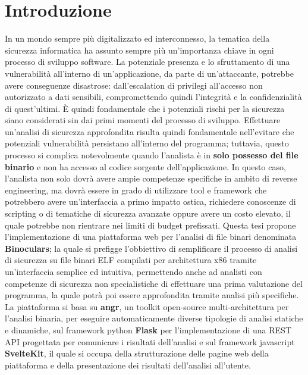 \documentclass[../main.tex]{subfiles}
\begin{document}
\chapter{Introduzione}
\label{chap:intro}
In un mondo sempre più digitalizzato ed interconnesso, la tematica della sicurezza informatica ha assunto sempre più un'importanza chiave in ogni processo di sviluppo software. 
La potenziale presenza e lo sfruttamento di una vulnerabilità all'interno di un'applicazione, da parte di un'attaccante, potrebbe avere conseguenze disastrose: dall'escalation di privilegi
all'accesso non autorizzato a dati sensibili, compromettendo quindi l'integrità e la confidenzialità di quest'ultimi.
È quindi fondamentale che i potenziali rischi per la sicurezza siano considerati sin dai primi momenti del processo di sviluppo.
Effettuare un'analisi di sicurezza approfondita risulta quindi fondamentale nell'evitare che potenziali vulnerabilità persistano all'interno del programma; tuttavia, questo processo
si complica notevolmente quando l'analista è in \textbf{solo possesso del file binario} e non ha accesso al codice sorgente dell'applicazione.
In questo caso, l'analista non solo dovrà avere ampie competenze specifiche in ambito di reverse engineering, ma dovrà essere in grado di utilizzare tool e framework che potrebbero avere
un'interfaccia a primo impatto ostica, richiedere conoscenze di scripting o di tematiche di sicurezza avanzate oppure avere un costo elevato, il quale potrebbe non rientrare nei limiti
di budget prefissati. 
Questa tesi propone l'implementazione di una piattaforma web per l'analisi di file binari denominata \textbf{Binoculars}; la quale si prefigge l'obbiettivo di
semplificare il processo di analisi di sicurezza su file binari ELF compilati per architettura x86 tramite un'interfaccia semplice ed intuitiva, permettendo anche ad analisti con competenze di sicurezza non specialistiche di 
effettuare una prima valutazione del programma, la quale potrà poi essere approfondita tramite analisi più specifiche.
La piattaforma si basa su \textbf{angr}, un toolkit open-source multi-architettura per l'analisi binaria, per eseguire automaticamente diverse tipologie di analisi statiche e dinamiche, sul framework python \textbf{Flask} per l'implementazione di una REST API progettata per 
comunicare i risultati dell'analisi e sul framework javascript \textbf{SvelteKit}, il quale si occupa della strutturazione delle pagine web della piattaforma e della presentazione dei risultati dell'analisi all'utente.
\end{document}

